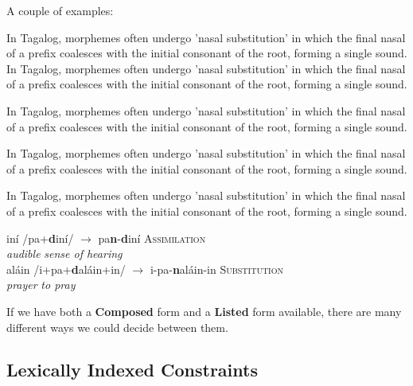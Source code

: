 \documentclass[12]{article}
\begin{document}
		A couple of examples: 
		
			In Tagalog, morphemes often undergo 'nasal substitution' in which the final nasal of a prefix coalesces with the initial consonant of the root, forming a single sound.
					In Tagalog, morphemes often undergo 'nasal substitution' in which the final nasal of a prefix coalesces with the initial consonant of the root, forming a single sound.
					
							In Tagalog, morphemes often undergo 'nasal substitution' in which the final nasal of a prefix coalesces with the initial consonant of the root, forming a single sound.
							
									In Tagalog, morphemes often undergo 'nasal substitution' in which the final nasal of a prefix coalesces with the initial consonant of the root, forming a single sound.
									
									
		In Tagalog, morphemes often undergo 'nasal substitution' in which the final nasal of a prefix coalesces with the initial consonant of the root, forming a single sound.
		
		
		\begin{exe}
			\ex
				\begin{xlist}
					\ex {}in\'i\textscriptg  \hspace{3ex} /pa{\bf {}}+{\bf d}in\'i\textscriptg/ \hspace{8ex} $\rightarrow$ pa{\bf n}-{\bf d}in\'i\textscriptg   \hspace{7ex} \textsc{Assimilation}\\
					{\it audible} {} {} {} {\it sense of hearing}\\
					\ex {}al\'ain \hspace{0.1ex} /i+pa{\bf \textipa{N}}+{\bf d}al\'ain+in/  $\rightarrow$ \textglotstop i-pa-{\bf n}al\'ain-in \hspace{0.5ex} \textsc{Substitution}\\
					{\it prayer} {} {} {} {\it to pray}\\
				\end{xlist}
			
		\end{exe}
		
		
		
		If we have both a {\bf Composed} form and a {\bf Listed} form available, there are many different ways we could decide between them.  
		
		

	\subsection{Lexically Indexed Constraints}
\end{document}
